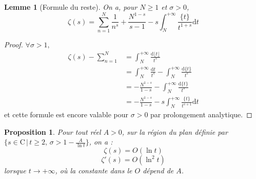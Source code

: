 \documentclass[french]{report}
\newtheorem{proposition}[theorem]{Proposition}
\newtheorem{lemma}[theorem]{Lemme}
\begin{document}
\begin{lemma}[Formule du reste]\label{lem:formule-du-reste}
  On a, pour $N\geq1$ et $\sigma>0$,
  \[
    \zeta(s)
    = \sum_{n=1}^N\frac{1}{n^s}
    + \frac{N^{1-s}}{s-1}-s\int_N^{+\infty}\frac{\{t\}}{t^{1+s}}\mathrm{d}t
  \]
\end{lemma}

\begin{proof}
  $\forall\sigma>1,$
  \begin{align*}
    \zeta(s)-\sum_{n=1}^N
    &= \int_N^{+\infty}\frac{\mathrm{d}\lfloor t\rfloor}{t^s} \\
    &= \int_N^{+\infty}\frac{\mathrm{d}t}{t^s} - \int_N^{+\infty}\frac{\mathrm{d}\{t\}}{t^s} \\
    & = -\frac{N^{1-s}}{1-s} - \int_N^{+\infty}\frac{\mathrm{d}\{t\}}{t^s} \\
    & = -\frac{N^{1-s}}{1-s} - s\int_N^{+\infty}\frac{\{t\}}{t^{s+1}}\mathrm{d}t
  \end{align*}
  et cette formule est encore valable pour $\sigma>0$ par prolongement analytique.
\end{proof}

\begin{proposition}\label{prop:majoration-zeta-et-zeta-prime}
  Pour tout réel $A>0$, sur la région du plan définie par $\{s\in\mathrm{C}\,|\,t\geq2,\,\sigma>1-\frac{A}{\ln t}\}$, on a :
  \[ \zeta(s) = O(\ln t) \]
  \[ \zeta'(s) = O(\ln^2 t) \]
  lorsque $t\rightarrow+\infty$, où la constante dans le $O$ dépend de $A$.
\end{proposition}
\end{document}
